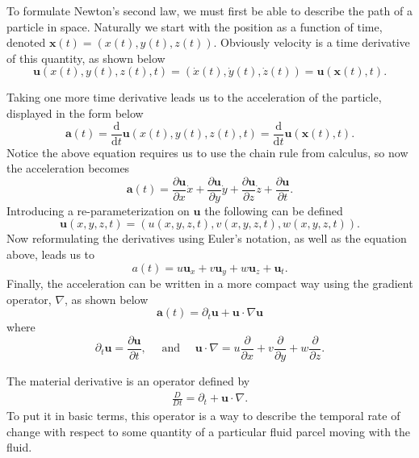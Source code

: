 \documentclass[undefended]{sfuthesis}
\begin{document}
To formulate Newton's second law, we must first be able to describe the path of a particle in space. Naturally we start with the position as a function of time, denoted $\textbf{x}(t) = (x(t), y(t), z(t)).$ Obviously velocity is a time derivative of this quantity, as shown below \[\textbf{u}(x(t), y(t), z(t), t) = (\dot{x}(t), \dot{y}(t), \dot{z}(t)) = \textbf{u}(\textbf{x}(t), t).\]

Taking one more time derivative leads us to the acceleration of the particle, displayed in the form below \[\textbf{a}(t) = \frac{\mathrm{d}}{\mathrm{d} t} \textbf{u} (x(t), y(t), z(t), t) = \frac{\mathrm{d}}{\mathrm{d} t} \textbf{u}(\textbf{x}(t), t).\] Notice the above equation requires us to use the chain rule from calculus, so now the acceleration becomes \[\textbf{a}(t) = \frac{\partial \textbf{u}}{\partial x} \dot{x} + \frac{\partial \textbf{u}}{\partial y} \dot{y} + \frac{\partial \textbf{u}}{\partial z} \dot{z} + \frac{\partial \textbf{u}}{\partial t}.\]
Introducing a re-parameterization on $\textbf{u}$ the following can be defined \[\textbf{u}(x, y, z, t) = (u(x, y, z, t), v(x, y, z, t), w(x, y, z, t)).\] Now reformulating the derivatives using Euler's notation, as well as the equation above, leads us to \[a(t) = u \textbf{u}_x + v \textbf{u}_y + w \textbf{u}_z +  \textbf{u}_t.\] Finally, the acceleration can be written in a more compact way using the gradient operator, $\nabla$, as shown below \[\textbf{a}(t) = \partial_t \textbf{u} + \textbf{u} \cdot \nabla \textbf{u}\] where \[\partial_t \textbf{u} = \frac{\partial \textbf{u}}{\partial t}, \quad \text{ and } \quad \textbf{u} \cdot \nabla = u \frac{\partial}{\partial x} + v \frac{\partial}{\partial y} + w \frac{\partial}{\partial z}.\]

The material derivative is an operator defined by
\begin{align}
\frac{D}{Dt} = \partial_t + \textbf{u} \cdot \nabla. \label{materialDeriv}
\end{align}
To put it in basic terms, this operator is a way to describe the temporal rate of change with respect to some quantity of a particular fluid parcel moving with the fluid.   
\end{document}
